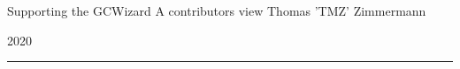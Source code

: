 \newpage
\LARGE
\begin{bfseries}
\begin{center}
Supporting the GCWizard
\linebreak
\linebreak
A contributors view
\linebreak 
\linebreak 
\linebreak 
Thomas 'TMZ' Zimmermann
\linebreak
\par\vfill
2020
\linebreak
\noindent\rule{\textwidth}{1pt}
\linebreak
\end{center}
\end{bfseries}
\normalsize